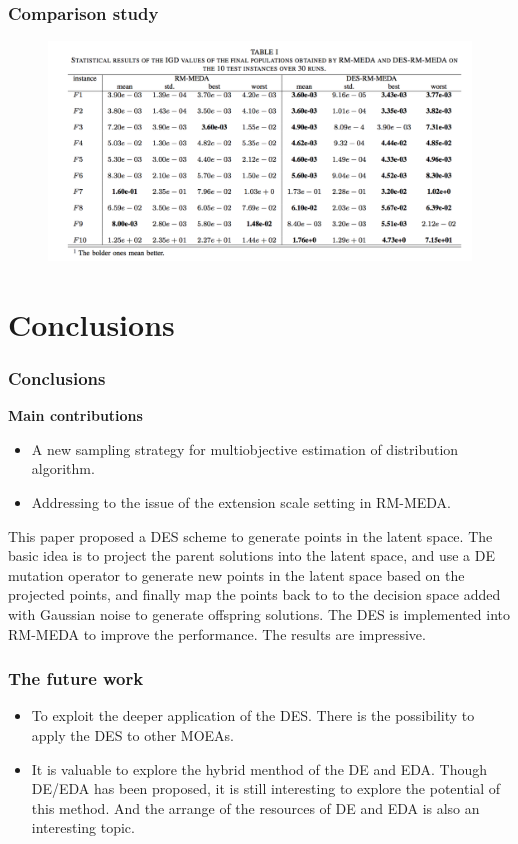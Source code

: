 \documentclass[xcolor=dvipsnames]{beamer}
\begin{document}
    \begin{frame}
    \frametitle{Comparison study}
    \begin{figure}
    \centering
    \includegraphics[width=1\columnwidth]{tab1.png}
    \end{figure}
    \end{frame}
    \section{Conclusions}
        \begin{frame}
        \frametitle{Conclusions}
        \textbf{Main contributions}
        \begin{itemize}
        \item A new sampling strategy for multiobjective estimation of distribution algorithm.
        \item Addressing to the issue of the extension scale setting in RM-MEDA.
        \end{itemize}
        This paper proposed a DES scheme to generate points in the latent space. The basic idea is to project the parent solutions
        into the latent space, and use a DE mutation operator to generate new points in the latent space based on the projected points, and finally map the points back to
        to the decision space added with Gaussian noise to generate offspring solutions. The DES is implemented into RM-MEDA to improve the performance. The results are impressive.
        \end{frame}

        \begin{frame}
        \frametitle{The future work}
       	\begin{itemize}
       	\item To exploit the deeper application of the DES. There is the possibility to apply the DES to other MOEAs.
       	\item It is valuable to explore the hybrid menthod of the DE and EDA. Though DE/EDA has been proposed, it is still interesting to explore the potential of this method.
       	And the arrange of the resources of DE and EDA is also an interesting topic.
       	\end{itemize}
       \end{frame}
\end{document}

